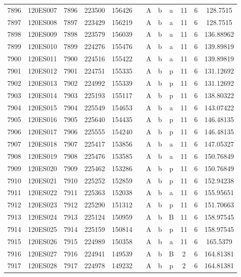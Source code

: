 \begin{tabular}{|*{12}{c|}}
7896 & 120ES007 & 7896 & 223500 & 156426 &  & A & b & a & 11 & 6 & 128.7515 \\ 
7897 & 120ES008 & 7897 & 223429 & 156219 &  & A & b & a & 11 & 6 & 128.7515 \\ 
7898 & 120ES009 & 7898 & 223579 & 156039 &  & A & b & a & 11 & 6 & 136.88962 \\ 
7899 & 120ES010 & 7899 & 224276 & 155476 &  & A & b & a & 11 & 6 & 139.89819 \\ 
7900 & 120ES011 & 7900 & 224516 & 155422 &  & A & b & a & 11 & 6 & 139.89819 \\ 
7901 & 120ES012 & 7901 & 224751 & 155335 &  & A & b & p & 11 & 6 & 131.12692 \\ 
7902 & 120ES013 & 7902 & 224992 & 155339 &  & A & b & p & 11 & 6 & 131.12692 \\ 
7903 & 120ES014 & 7903 & 225193 & 155117 &  & A & b & p & 11 & 6 & 138.80322 \\ 
7904 & 120ES015 & 7904 & 225549 & 154653 &  & A & b & a & 11 & 6 & 143.07422 \\ 
7905 & 120ES016 & 7905 & 225640 & 154435 &  & A & b & p & 11 & 6 & 146.48135 \\ 
7906 & 120ES017 & 7906 & 225555 & 154240 &  & A & b & p & 11 & 6 & 146.48135 \\ 
7907 & 120ES018 & 7907 & 225417 & 153856 &  & A & b & a & 11 & 6 & 147.05327 \\ 
7908 & 120ES019 & 7908 & 225476 & 153585 &  & A & b & a & 11 & 6 & 150.76849 \\ 
7909 & 120ES020 & 7909 & 225462 & 153286 &  & A & b & p & 11 & 6 & 150.76849 \\ 
7910 & 120ES021 & 7910 & 225252 & 152859 &  & A & b & p & 11 & 6 & 152.94238 \\ 
7911 & 120ES022 & 7911 & 225363 & 152038 &  & A & b & a & 11 & 6 & 155.95651 \\ 
7912 & 120ES023 & 7912 & 225290 & 151312 &  & A & b & p & 11 & 6 & 151.70663 \\ 
7913 & 120ES024 & 7913 & 225124 & 150959 &  & A & b & B & 11 & 6 & 158.97545 \\ 
7914 & 120ES025 & 7914 & 225159 & 150814 &  & A & b & p & 11 & 6 & 158.97545 \\ 
7915 & 120ES026 & 7915 & 224989 & 150358 &  & A & b & a & 11 & 6 & 165.5379 \\ 
7916 & 120ES027 & 7916 & 224941 & 149539 &  & A & b & B & 2 & 6 & 164.81381 \\ 
7917 & 120ES028 & 7917 & 224978 & 149232 &  & A & b & p & 2 & 6 & 164.81381 \\ 

\end{tabular}
